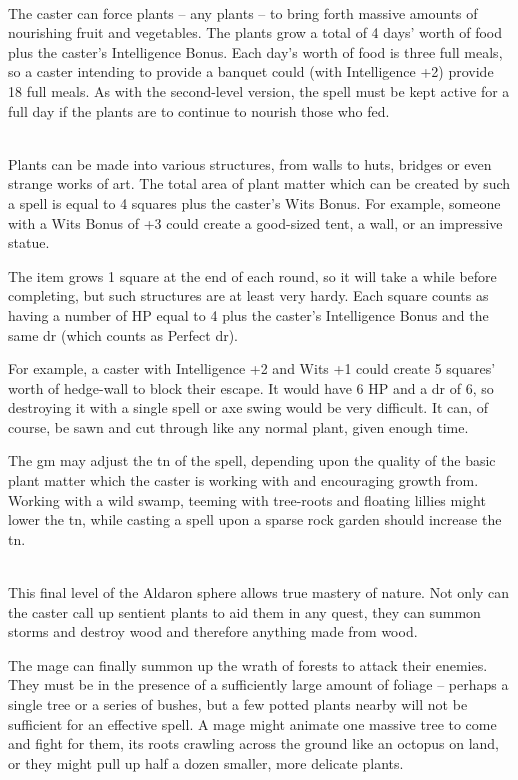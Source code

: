 \begin{multicols}{2}
\\
The caster can force plants -- any plants -- to bring forth massive amounts of nourishing fruit and vegetables. The plants grow a total of 4 days' worth of food plus the caster's Intelligence Bonus. Each day's worth of food is three full meals, so a caster intending to provide a banquet could (with Intelligence +2) provide 18 full meals. As with the second-level version, the spell must be kept active for a full day if the plants are to continue to nourish those who fed.

\\
Plants can be made into various structures, from walls to huts, bridges or even strange works of art. The total area of plant matter which can be created by such a spell is equal to 4 squares plus the caster's Wits Bonus. For example, someone with a Wits Bonus of +3 could create a good-sized tent, a wall, or an impressive statue.

The item grows 1 square at the end of each \gls{round}, so it will take a while before completing, but such structures are at least very hardy. Each square counts as having a number of HP equal to 4 plus the caster's Intelligence Bonus and the same \gls{dr} (which counts as Perfect \gls{dr}).

For example, a caster with Intelligence +2 and Wits +1 could create 5 squares' worth of hedge-wall to block their escape. It would have 6 HP and a \gls{dr} of 6, so destroying it with a single spell or axe swing would be very difficult. It can, of course, be sawn and cut through like any normal plant, given enough time.

The \gls{gm} may adjust the \gls{tn} of the spell, depending upon the quality of the basic plant matter which the caster is working with and encouraging growth from. Working with a wild swamp, teeming with tree-roots and floating lillies might lower the \gls{tn}, while casting a spell upon a sparse rock garden should increase the \gls{tn}.

\spelllevel

\\
This final level of the Aldaron sphere allows true mastery of nature. Not only can the caster call up sentient plants to aid them in any quest, they can summon storms and destroy wood and therefore anything made from wood.

The mage can finally summon up the wrath of forests to attack their enemies. They must be in the presence of a sufficiently large amount of foliage -- perhaps a single tree or a series of bushes, but a few potted plants nearby will not be sufficient for an effective spell. A mage might animate one massive tree to come and fight for them, its roots crawling across the ground like an octopus on land, or they might pull up half a dozen smaller, more delicate plants.


\end{multicols}
